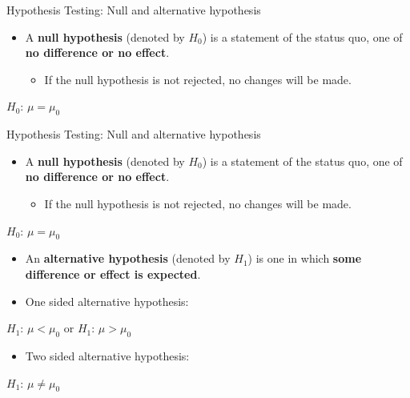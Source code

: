 \documentclass[
  ignorenonframetext,
]{beamer}
\providecommand{\tightlist}{%
  \setlength{\itemsep}{0pt}\setlength{\parskip}{0pt}}
\begin{document}
\begin{frame}{Hypothesis Testing: Null and alternative hypothesis}
\label{hypothesis-testing-null-and-alternative-hypothesis}
\begin{itemize}
\tightlist
\item
  A \textbf{null hypothesis} (denoted by \(H_0\)) is a statement of the
  status quo, one of \textbf{no difference or no effect}.

  \begin{itemize}
  \tightlist
  \item
    If the null hypothesis is not rejected, no changes will be made.
  \end{itemize}
\end{itemize}

\centering

\(H_0\): \(\mu = \mu_0\)\\

\vspace{1cm}
\end{frame}

\begin{frame}{Hypothesis Testing: Null and alternative hypothesis}
\label{hypothesis-testing-null-and-alternative-hypothesis-1}
\begin{itemize}
\tightlist
\item
  A \textbf{null hypothesis} (denoted by \(H_0\)) is a statement of the
  status quo, one of \textbf{no difference or no effect}.

  \begin{itemize}
  \tightlist
  \item
    If the null hypothesis is not rejected, no changes will be made.
  \end{itemize}
\end{itemize}

\centering

\(H_0\): \(\mu = \mu_0\)\\

\vspace{1cm}

\begin{itemize}
\item
  An \textbf{alternative hypothesis} (denoted by \(H_1\)) is one in
  which \textbf{some difference or effect is expected}.
\item
  One sided alternative hypothesis:
\end{itemize}

\centering

\(H_1\): \(\mu < \mu_0\) or \(H_1\): \(\mu > \mu_0\)\\

\begin{itemize}
\tightlist
\item
  Two sided alternative hypothesis:
\end{itemize}

\centering

\(H_1\): \(\mu \neq \mu_0\)\\
\end{frame}
\end{document}
